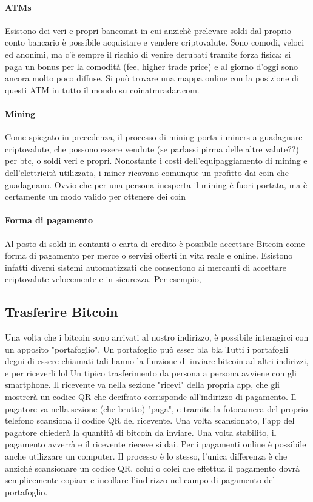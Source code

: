 \documentclass {article}
\begin{document}
\paragraph {ATMs}


Esistono dei veri e propri bancomat in cui anzichè prelevare soldi dal proprio conto bancario è possibile acquistare e vendere criptovalute.
Sono comodi, veloci ed anonimi, ma c'è sempre il rischio di venire derubati tramite forza fisica; si paga un bonus per la comodità (fee, higher trade price) e al giorno d'oggi sono ancora molto poco diffuse.
Si può trovare una mappa online con la posizione di questi ATM in tutto il mondo su coinatmradar.com.


\paragraph {Mining}


Come spiegato in precedenza, il processo di mining porta i miners a guadagnare criptovalute, che possono essere vendute (se parlassi pirma delle altre valute??) per btc, o soldi veri e propri.
Nonostante i costi dell'equipaggiamento di mining e dell'elettricità utilizzata, i miner ricavano comunque un profitto dai coin che guadagnano.
Ovvio che per una persona inesperta il mining è fuori portata, ma è certamente un modo valido per ottenere dei coin


\paragraph {Forma di pagamento}


Al posto di soldi in contanti o carta di credito è possibile accettare Bitcoin come forma di pagamento per merce o servizi offerti in vita reale e online.
Esistono infatti diversi sistemi automatizzati che consentono ai mercanti di accettare criptovalute velocemente e in sicurezza.
Per esempio, 


\subsection {Trasferire Bitcoin}


Una volta che i bitcoin sono arrivati al nostro indirizzo, è possibile interagirci con un apposito "portafoglio". Un portafoglio può esser bla bla
Tutti i portafogli degni di essere chiamati tali hanno la funzione di inviare bitcoin ad altri indirizzi, e per riceverli lol
Un tipico trasferimento da persona a persona avviene con gli smartphone.
Il ricevente va nella sezione "ricevi" della propria app, che gli mostrerà un codice QR che decifrato corrisponde all'indirizzo di pagamento.
Il pagatore va nella sezione (che brutto) "paga", e tramite la fotocamera del proprio telefono scansiona il codice QR del ricevente.
Una volta scansionato, l'app del pagatore chiederà la quantità di bitcoin da inviare. Una volta stabilito, il pagamento avverrà e il ricevente rieceve si dai.
Per i pagamenti online è possibile anche utilizzare un computer. Il processo è lo stesso, l'unica differenza è che anziché scansionare un codice QR, colui o colei che effettua il pagamento dovrà semplicemente copiare e incollare l'indirizzo nel campo di pagamento del portafoglio.
\end{document}
